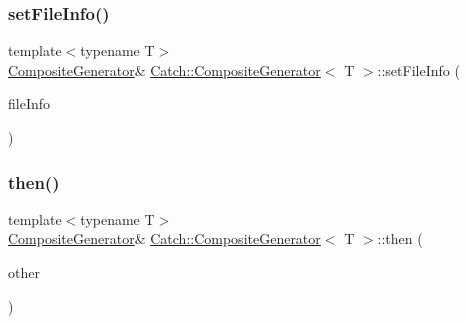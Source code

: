 \mbox{\label{class_catch_1_1_composite_generator_ac3c57cf4ca5472f440bf71e2936bcd4a}} 
\subsubsection{\texorpdfstring{set\+File\+Info()}{setFileInfo()}}
{\footnotesize\ttfamily template$<$typename T$>$ \\
\hyperlink{class_catch_1_1_composite_generator}{Composite\+Generator}\& \hyperlink{class_catch_1_1_composite_generator}{Catch\+::\+Composite\+Generator}$<$ T $>$\+::set\+File\+Info (\begin{DoxyParamCaption}\item[{const char $\ast$}]{file\+Info }\end{DoxyParamCaption})\hspace{0.3cm}{\ttfamily [inline]}}

\mbox{\label{class_catch_1_1_composite_generator_a2e03f42df85cdd238aabd77a80b075d5}} 
\subsubsection{\texorpdfstring{then()}{then()}\hspace{0.1cm}{\footnotesize\ttfamily [1/2]}}
{\footnotesize\ttfamily template$<$typename T$>$ \\
\hyperlink{class_catch_1_1_composite_generator}{Composite\+Generator}\& \hyperlink{class_catch_1_1_composite_generator}{Catch\+::\+Composite\+Generator}$<$ T $>$\+::then (\begin{DoxyParamCaption}\item[{\hyperlink{class_catch_1_1_composite_generator}{Composite\+Generator}$<$ T $>$ \&}]{other }\end{DoxyParamCaption})\hspace{0.3cm}{\ttfamily [inline]}}

\mbox{\label{class_catch_1_1_composite_generator_aefdc11bcfccdf07d2db5f0da3ed8758c}} 
